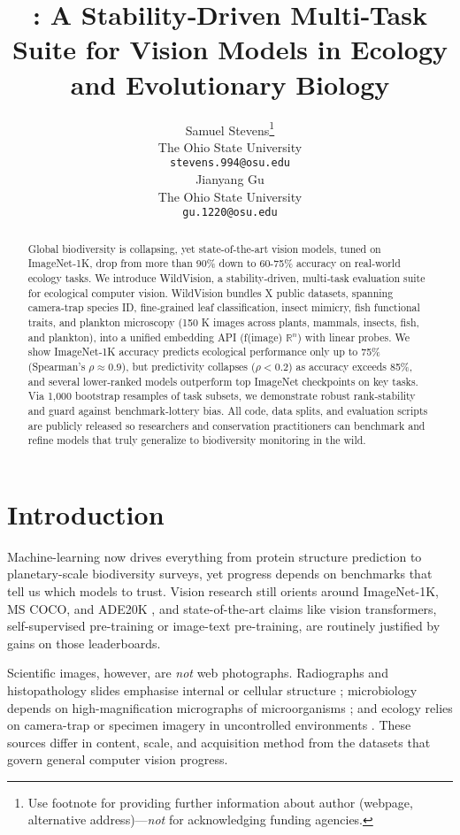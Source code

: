 \documentclass{article}
\title{\benchmarkname{}: A Stability‑Driven Multi‑Task Suite for Vision Models in Ecology and Evolutionary Biology}
\author{%
  Samuel Stevens\thanks{Use footnote for providing further information
    about author (webpage, alternative address)---\emph{not} for acknowledging funding agencies.} \\
  The Ohio State University\\
  \texttt{stevens.994@osu.edu} \\
  \And
  Jianyang Gu \\
  The Ohio State University \\
  \texttt{gu.1220@osu.edu} \\
}
\newcommand{\benchmarkname}{WildVision}
\begin{document}
\maketitle


\begin{abstract}
  Global biodiversity is collapsing, yet state-of-the-art vision models, tuned on ImageNet‑1K, drop from more than 90\% down to 60-75\% accuracy on real‑world ecology tasks. 
  We introduce \benchmarkname{}, a stability‑driven, multi‑task evaluation suite for ecological computer vision. 
  \benchmarkname{} bundles X public datasets, spanning camera‑trap species ID, fine‑grained leaf classification, insect mimicry, fish functional traits, and plankton microscopy (150 K images across plants, mammals, insects, fish, and plankton), into a unified embedding API (f(image) $\mathbb{R}^n$) with linear probes. 
  We show ImageNet‑1K accuracy predicts ecological performance only up to 75\% (Spearman’s $\rho \approx0.9$), but predictivity collapses ($\rho < 0.2$) as accuracy exceeds 85\%, and several lower‑ranked models outperform top ImageNet checkpoints on key tasks. 
  Via 1,000 bootstrap resamples of task subsets, we demonstrate robust rank‑stability and guard against benchmark‑lottery bias. 
  All code, data splits, and evaluation scripts are publicly released so researchers and conservation practitioners can benchmark and refine models that truly generalize to biodiversity monitoring in the wild.
\end{abstract}





\section{Introduction}

Machine-learning now drives everything from protein structure prediction to planetary-scale biodiversity surveys, yet progress depends on benchmarks that tell us which models to trust.
Vision research still orients around ImageNet-1K, MS COCO, and ADE20K \citep{deng2009imagenet1k,lin2014mscoco,zhou2017ade20k}, and state-of-the-art claims like vision transformers, self-supervised pre-training or image-text pre-training, are routinely justified by gains on those leaderboards.

Scientific images, however, are \textit{not} web photographs.
Radiographs and histopathology slides emphasise internal or cellular structure \citep{zech2018three}; microbiology depends on high-magnification micrographs of microorganisms \citep{raghu2019transfusion}; and ecology relies on camera-trap or specimen imagery in uncontrolled environments \citep{tuia2022perspectives,weinstein2018computer}.
These sources differ in content, scale, and acquisition method from the datasets that govern general computer vision progress.
\end{document}
